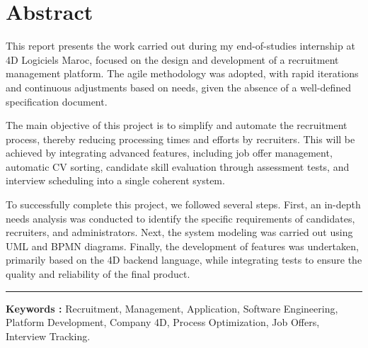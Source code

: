 \chapter*{Abstract}

This report presents the work carried out during my end-of-studies internship at 4D Logiciels Maroc, focused on the design and development of a recruitment management platform. The agile methodology was adopted, with rapid iterations and continuous adjustments based on needs, given the absence of a well-defined specification document.
\newline

The main objective of this project is to simplify and automate the recruitment process, thereby reducing processing times and efforts by recruiters. This will be achieved by integrating advanced features, including job offer management, automatic CV sorting, candidate skill evaluation through assessment tests, and interview scheduling into a single coherent system.
\newline

To successfully complete this project, we followed several steps. First, an in-depth needs analysis was conducted to identify the specific requirements of candidates, recruiters, and administrators. Next, the system modeling was carried out using UML and BPMN diagrams. Finally, the development of features was undertaken, primarily based on the 4D backend language, while integrating tests to ensure the quality and reliability of the final product.
\newline


\vspace{1cm}
\noindent\rule[2pt]{\textwidth}{0.5pt}
\textbf{Keywords :} Recruitment, Management, Application, Software Engineering, Platform Development, Company 4D, Process Optimization, Job Offers, Interview Tracking.


